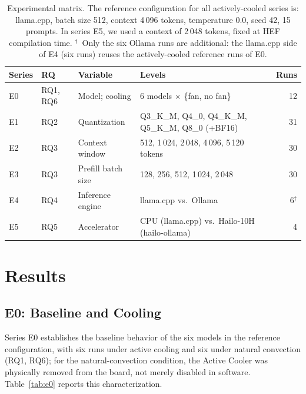 \documentclass[acmsmall,natbib=false]{acmart}
\begin{document}
\begin{table}[t]
\centering
\caption{Experimental matrix. The reference configuration for all
actively-cooled series is: llama.cpp, batch size 512, context 4\,096 tokens,
temperature 0.0, seed 42, 15 prompts. In series E5, we used a context of 2\,048
tokens, fixed at HEF compilation time.
$^{\dagger}$~Only the six Ollama runs are additional: the llama.cpp side of E4 (six runs) reuses the actively-cooled reference runs of E0.}
\label{tab:matrix}
\small
\setlength{\tabcolsep}{5pt}
\begin{tabular}{l l l l r}
\toprule
\textbf{Series} & \textbf{RQ} & \textbf{Variable} & \textbf{Levels} &
\textbf{Runs} \\
\midrule
E0 & RQ1, RQ6 & Model; cooling & 6 models $\times$ \{fan, no fan\} & 12 \\
E1 & RQ2 & Quantization & Q3\_K\_M, Q4\_0, Q4\_K\_M, Q5\_K\_M, Q8\_0 (+BF16) & 31 \\
E2 & RQ3 & Context window & 512, 1\,024, 2\,048, 4\,096, 5\,120 tokens & 30 \\
E3 & RQ3 & Prefill batch size & 128, 256, 512, 1\,024, 2\,048 & 30 \\
E4 & RQ4 & Inference engine & llama.cpp vs.\ Ollama & 6$^{\dagger}$ \\
E5 & RQ5 & Accelerator & CPU (llama.cpp) vs.\ Hailo-10H (hailo-ollama) & 4 \\
\bottomrule
\end{tabular}
\end{table}

\section{Results}\label{sec:results}

\subsection{E0: Baseline and Cooling}\label{sec:results_e0}

Series E0 establishes the baseline behavior of the six models in the
reference configuration, with six runs under active cooling and six under
natural convection (RQ1, RQ6); for the natural-convection condition, the
Active Cooler was physically removed from the board, not merely disabled in
software. Table~\ref{tab:e0} reports this characterization.
\end{document}
